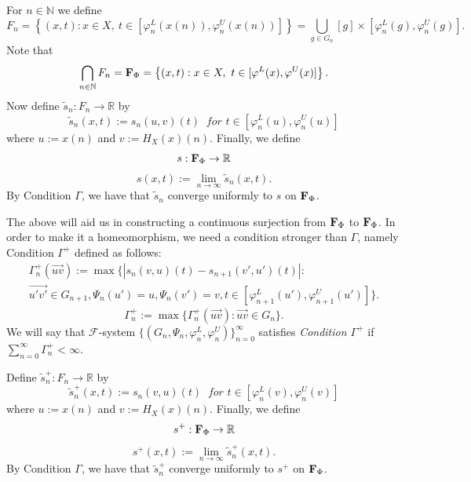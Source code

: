 \documentclass[11pt]{amsart}
\newcommand{\N}{\mathbb{N}}  %
\newcommand{\R}{\mathbb{R}}  %
\newcommand{\oa}{\overrightarrow}
\newcommand{\cF}{\mathcal{F}}
\newcommand{\fsystem}{\{(G_n, \Psi_n,\varphi^L_n,\varphi^U_n)\}_{n=0}^{\infty}}
\begin{document}
{ 
 For $n \in \N$ we define  \[F_n =  \left \{(x,t): x \in X,  \ t \in [\varphi^L_n(x(n)), \varphi^U_n(x(n))]  \right \} = \bigcup_{g \in G_n} [g] \times [\varphi^L_n(g), \varphi^U_n(g)]. \] 
 Note that 
 \[ \bigcap_{n\in \N} F_n = {\bf F}_{\Phi} =  \left \{(x,t): x \in X,  \ t \in [\varphi^L(x), \varphi^U(x)]  \right \}.  \]  Now define $\tilde{s}_n:F_n  \rightarrow \mathbb{R}$ by 
\[\tilde{s}_n(x, t ):= s_n(u, v)(t) \ \textit{ for } t \in [\varphi^L_n(u), \varphi^U_n(u)]\]
where $u:=x(n)$ and $v:=H_X(x)(n)$. Finally, we define $$s:{\bf F}_{\Phi}  \rightarrow \mathbb{R}$$
\begin{equation}\label{eq:s(x)_new}
s(x, t ):= \lim_{n\to \infty} \tilde{s}_n (x, t).
\end{equation}
By Condition $\Gamma$, we have that $\tilde{s}_n$ converge uniformly to $s$ on ${\bf F}_{\Phi}$. 


The above will aid us in constructing a continuous surjection from ${\bf F}_{\Phi}$ to ${\bf F}_{\Phi}$. In order to make it a homeomorphism, we need a condition stronger than $\Gamma$, namely Condition $\Gamma^+$
 defined as follows:
 \begin{equation}\label{def:Fgamma_n+}
\begin{split}
\Gamma^+_n(\oa{uv}):=  \max\Biggl\{ \left | s_n (v, u) (t)   - s_{n+1} (v',u') (t) \right | : \\
\oa{u'v'}\in G_{n+1}, 
\Psi_n(u')=u,  \Psi_n(v')=v
,
t \in [\varphi_{n+1}^L(u'),\varphi_{n+1}^U(u')]\Biggl\}. 
\end{split}
\end{equation}
\begin{equation}
\Gamma^+_n:=\max\{\Gamma^+_n(\oa{uv}):  \oa{uv}\in G_n\}.
\end{equation}
We will say that $\cF$-system $\fsystem$ satisfies \emph{Condition $\Gamma^+$} if $\sum^{\infty}_{n=0} \Gamma^+_n < \infty$.

Define $\tilde s^{+}_n:F_n  \rightarrow \mathbb{R}$ by 
\[\tilde{s}^{+}_n(x, t ):= s_n(v, u)(t) \ \textit{ for } t \in [\varphi^L_n(v), \varphi^U_n(v)]\]
where $u:=x(n)$ and $v:=H_X(x)(n)$. Finally, we define $$s^{+}:{\bf F}_{\Phi}  \rightarrow \mathbb{R}$$
\begin{equation}\label{eq:s+(x)}
s^{+}(x, t ):= \lim_{n\to \infty} \tilde{s}^{+}_n (x, t).
\end{equation}
By Condition $\Gamma$, we have that $\tilde{s}^{+}_n$ converge uniformly to $s^{+}$ on ${\bf F}_{\Phi}$.

}
\end{document}
